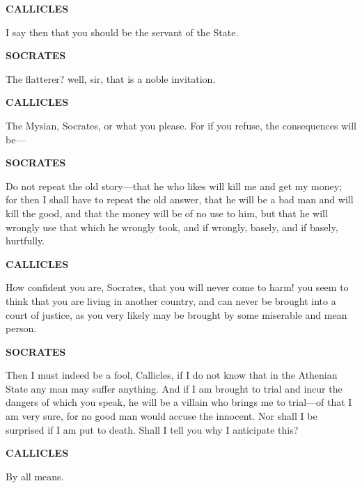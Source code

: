 \documentclass[11pt,letter]{article}
\begin{document}
\par \textbf{CALLICLES}
\par   I say then that you should be the servant of the State.

\par \textbf{SOCRATES}
\par   The flatterer? well, sir, that is a noble invitation.

\par \textbf{CALLICLES}
\par   The Mysian, Socrates, or what you please. For if you refuse, the consequences will be—

\par \textbf{SOCRATES}
\par   Do not repeat the old story—that he who likes will kill me and get my money; for then I shall have to repeat the old answer, that he will be a bad man and will kill the good, and that the money will be of no use to him, but that he will wrongly use that which he wrongly took, and if wrongly, basely, and if basely, hurtfully.

\par \textbf{CALLICLES}
\par   How confident you are, Socrates, that you will never come to harm! you seem to think that you are living in another country, and can never be brought into a court of justice, as you very likely may be brought by some miserable and mean person.

\par \textbf{SOCRATES}
\par   Then I must indeed be a fool, Callicles, if I do not know that in the Athenian State any man may suffer anything. And if I am brought to trial and incur the dangers of which you speak, he will be a villain who brings me to trial—of that I am very sure, for no good man would accuse the innocent. Nor shall I be surprised if I am put to death. Shall I tell you why I anticipate this?

\par \textbf{CALLICLES}
\par   By all means.
\end{document}
